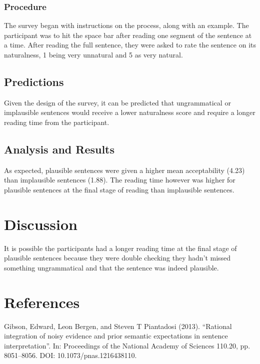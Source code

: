 \documentclass[12pt,a4paper]{article}
\begin{document}
\subsubsection{Procedure}
The survey began with instructions on the process, along with an example. The participant was to hit the space bar after reading one segment of the sentence at a time. After reading the full sentence, they were asked to rate the sentence on its naturalness, 1 being very unnatural and 5 as very natural.
\subsection{Predictions}
Given the design of the survey, it can be predicted that ungrammatical or implausible sentences would receive a lower naturalness score and require a longer reading time from the participant.
\subsection{Analysis and Results}
As expected, plausible sentences were given a higher mean acceptability (4.23) than implausible sentences (1.88). The reading time however was higher for plausible sentences at the final stage of reading than implausible sentences.
\section{Discussion}
It is possible the participants had a longer reading time at the final stage of plausible sentences because they were double checking they hadn't missed something ungrammatical and that the sentence was indeed plausible.
\section{References}
Gibson, Edward, Leon Bergen, and Steven T Piantadosi (2013).
“Rational integration of noisy evidence and prior semantic
expectations in sentence interpretation”. In: Proceedings of the
National Academy of Sciences 110.20, pp. 8051–8056. DOI:
10.1073/pnas.1216438110.
\end{document}
